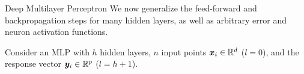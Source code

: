 \begin{frame}{Deep Multilayer Perceptron}
We now generalize the feed-forward and backpropagation steps for
many hidden layers, as well as arbitrary error
and neuron activation functions.

\medskip

Consider an MLP with $h$ hidden layers, %
$n$ input points ${\boldsymbol x}_i \in
{\mathord{\mathbb R}}^d$ ($l=0$), and the response vector ${\boldsymbol y}_i \in
{\mathord{\mathbb R}}^p$ ($l=h+1$). 

	\medskip


\end{frame}
